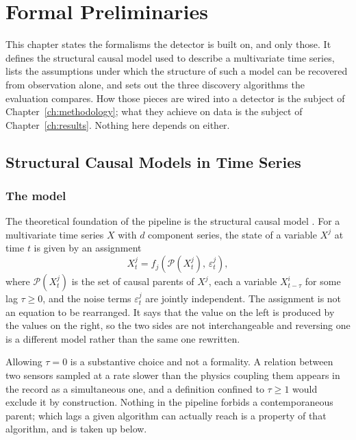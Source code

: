 \chapter{Formal Preliminaries}
\label{ch:background}

This chapter states the formalisms the detector is built on, and only those. It defines the structural causal model used to describe a multivariate time series, lists the assumptions under which the structure of such a model can be recovered from observation alone, and sets out the three discovery algorithms the evaluation compares. How those pieces are wired into a detector is the subject of Chapter~\ref{ch:methodology}; what they achieve on data is the subject of Chapter~\ref{ch:results}. Nothing here depends on either.

\section{Structural Causal Models in Time Series}
\label{sec:bg-scm}

\subsection{The model}

The theoretical foundation of the pipeline is the structural causal model \cite{pearl2009causality, peters2017elements}. For a multivariate time series $X$ with $d$ component series, the state of a variable $X^j$ at time $t$ is given by an assignment
\[
  X_t^j = f_j\!\left(\mathcal{P}(X_t^j),\, \varepsilon_t^j\right),
\]
where $\mathcal{P}(X_t^j)$ is the set of causal parents of $X^j$, each a variable $X_{t-\tau}^i$ for some lag $\tau \ge 0$, and the noise terms $\varepsilon_t^j$ are jointly independent. The assignment is not an equation to be rearranged. It says that the value on the left is produced by the values on the right, so the two sides are not interchangeable and reversing one is a different model rather than the same one rewritten.

Allowing $\tau = 0$ is a substantive choice and not a formality. A relation between two sensors sampled at a rate slower than the physics coupling them appears in the record as a simultaneous one, and a definition confined to $\tau \ge 1$ would exclude it by construction. Nothing in the pipeline forbids a contemporaneous parent; which lags a given algorithm can actually reach is a property of that algorithm, and is taken up below.

